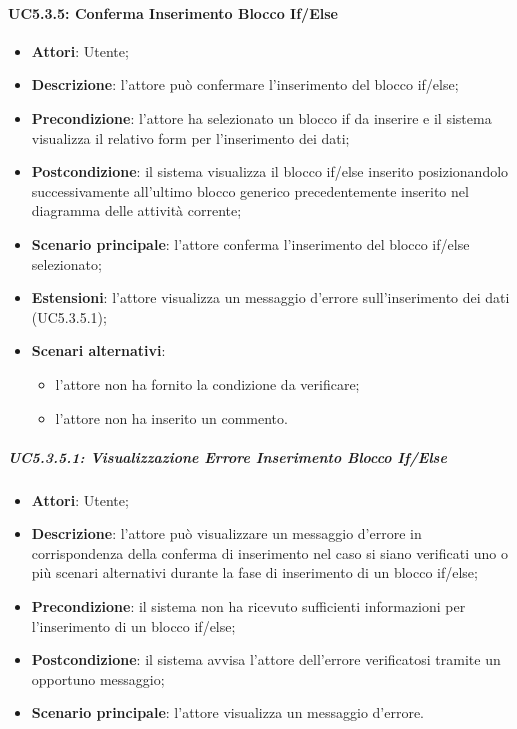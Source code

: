 \paragraph{UC5.3.5: Conferma Inserimento Blocco If/Else}
\label{UC5.3.5}
\begin{itemize}
\item \textbf{Attori}: Utente;
\item \textbf{Descrizione}: l'attore può confermare l'inserimento del blocco if/else;	
\item \textbf{Precondizione}: l'attore ha selezionato un blocco if da inserire e il sistema visualizza il relativo form per l'inserimento dei dati;	
\item \textbf{Postcondizione}: il sistema visualizza il blocco if/else inserito posizionandolo successivamente all'ultimo blocco generico precedentemente inserito nel diagramma delle attività corrente;
\item \textbf{Scenario principale}:
l'attore conferma l'inserimento del blocco if/else selezionato;	
\item \textbf{Estensioni}:
l'attore visualizza un messaggio d'errore sull'inserimento dei dati (UC5.3.5.1);	
\item \textbf{Scenari alternativi}:
\begin{itemize}
\item l'attore non ha fornito la condizione da verificare;
\item l'attore non ha inserito un commento.
\end{itemize}
\end{itemize}

\subparagraph{UC5.3.5.1: Visualizzazione Errore Inserimento Blocco If/Else}
\label{UC5.3.5.1}
\begin{itemize}
\item \textbf{Attori}: Utente;
\item \textbf{Descrizione}: l'attore può visualizzare un messaggio d'errore in corrispondenza della conferma di inserimento nel caso si siano verificati uno o più scenari alternativi durante la fase di inserimento di un blocco if/else;	
\item \textbf{Precondizione}: il sistema non ha ricevuto sufficienti informazioni per l'inserimento di un blocco if/else;	
\item \textbf{Postcondizione}: il sistema avvisa l'attore dell'errore verificatosi tramite un opportuno messaggio;	
\item \textbf{Scenario principale}:
l'attore visualizza un messaggio d'errore.	
\end{itemize}

